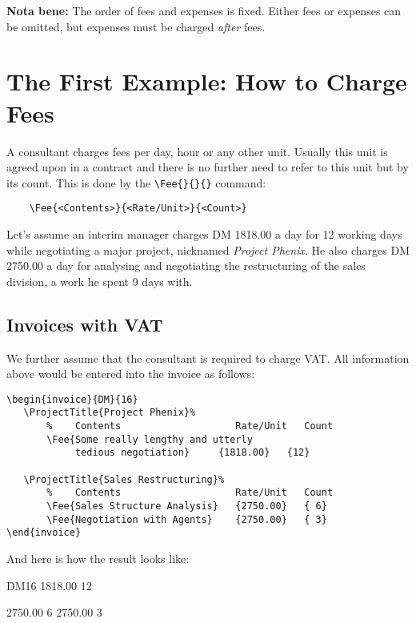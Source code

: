 \documentclass[11pt]{ltxdoc}
\begin{document}
\textbf{Nota bene:} The order of fees and expenses is fixed. Either fees or
expenses can be omitted, but expenses must be charged \textit{after}
fees.


\section{The First Example: How to Charge Fees}


A consultant charges fees per day, hour or any other unit. Usually
this unit is agreed upon in a contract and there is no further need
to refer to this unit but by its count. This is done by the
\verb-\Fee{}{}{}- command:

\begin{verbatim}
	\Fee{<Contents>}{<Rate/Unit>}{<Count>}
\end{verbatim}

Let's assume an interim manager
charges DM 1818.00 a day for 12 working days while
negotiating a major project, nicknamed \textit{Project Phenix}.
He also charges DM 2750.00 a day for analysing and negotiating
the restructuring of the sales division, a work he spent 9 days with.

\subsection{Invoices with VAT}

We further assume that the consultant is required to charge VAT.
All information above would be entered into the invoice as follows:

\begin{verbatim}
\begin{invoice}{DM}{16}
   \ProjectTitle{Project Phenix}%
       %    Contents                    Rate/Unit   Count
       \Fee{Some really lengthy and utterly
       		tedious negotiation}     {1818.00}   {12}

   \ProjectTitle{Sales Restructuring}%
       %    Contents                    Rate/Unit   Count
       \Fee{Sales Structure Analysis}   {2750.00}   { 6}
       \Fee{Negotiation with Agents}    {2750.00}   { 3}
\end{invoice}
\end{verbatim}

And here is how the result looks like:

\begin{invoice}{DM}{16}
		{1818.00}	{12}

           {2750.00}   { 6}
            {2750.00}   { 3}
\end{invoice}
\end{document}
